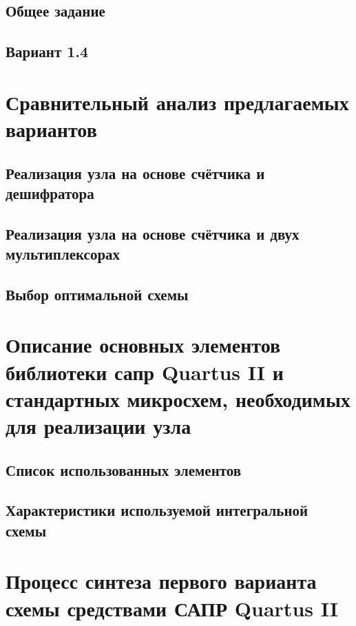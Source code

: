 \documentclass[a4paper,14pt,russian]{article}
\begin{document}
\subsection{Общее задание}


\subsection{Вариант 1.4}


\section{Сравнительный анализ предлагаемых вариантов}

\subsection{Реализация узла на основе счётчика и дешифратора}


\subsection{Реализация узла на основе счётчика и двух мультиплексорах}


\subsection{Выбор оптимальной схемы}


\section{Описание основных элементов библиотеки сапр Quartus II и стандартных микросхем, необходимых для реализации узла}

\subsection{Список использованных элементов}


\subsection{Характеристики используемой интегральной схемы}


\section{Процесс синтеза первого варианта схемы средствами САПР Quartus II}

\end{document}
